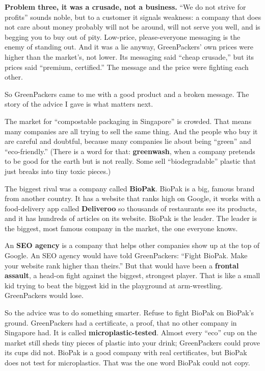 \documentclass[10pt,twoside,openany]{memoir}
\begin{document}
{\textbf{Problem three, it was a crusade, not a business.} ``We do not
strive for profits'' sounds noble, but to a customer it signals
weakness: a company that does not care about money probably will not be
around, will not serve you well, and is begging you to buy out of pity.
Low-price, please-everyone messaging is the enemy of standing out. And
it was a lie anyway, GreenPackers' own prices were higher than the
market's, not lower. Its messaging said ``cheap crusade,'' but its
prices said ``premium, certified.'' The message and the price were
fighting each other.

So GreenPackers came to me with a good product and a broken message. The
story of the advice I gave is what matters next.

The market for ``compostable packaging in Singapore'' is crowded. That
means many companies are all trying to sell the same thing. And the
people who buy it are careful and doubtful, because many companies lie
about being ``green'' and ``eco-friendly.'' (There is a word for that:
\textbf{greenwash}, when a company pretends to be good for the earth but
is not really. Some sell ``biodegradable'' plastic that just breaks into
tiny toxic pieces.)

The biggest rival was a company called \textbf{BioPak}. BioPak is a big,
famous brand from another country. It has a website that ranks high on
Google, it works with a food-delivery app called \textbf{Deliveroo} so
thousands of restaurants see its products, and it has hundreds of
articles on its website. BioPak is the leader. The leader is the
biggest, most famous company in the market, the one everyone knows.

An \textbf{SEO agency} is a company that helps other companies show up
at the top of Google. An SEO agency would have told GreenPackers:
``Fight BioPak. Make your website rank higher than theirs.'' But that
would have been a \textbf{frontal assault}, a head-on fight against the
biggest, strongest player. That is like a small kid trying to beat the
biggest kid in the playground at arm-wrestling. GreenPackers would lose.

So the advice was to do something smarter. Refuse to fight BioPak on
BioPak's ground. GreenPackers had a certificate, a proof, that no other
company in Singapore had. It is called \textbf{microplastic-tested}.
Almost every ``eco'' cup on the market still sheds tiny pieces of
plastic into your drink; GreenPackers could prove its cups did not.
BioPak is a good company with real certificates, but BioPak does not
test for microplastics. That was the one word BioPak could not copy.

}
\end{document}

